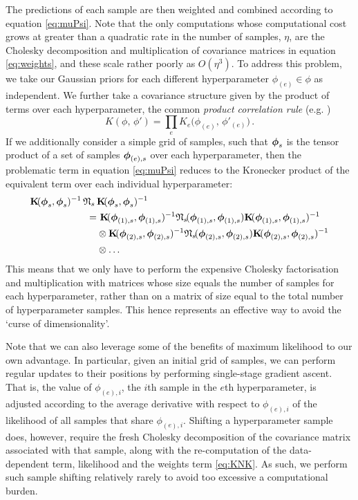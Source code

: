 \documentclass{acmtrans2m}
\begin{document}
The predictions of each sample are then weighted and combined according to equation \eqref{eq:muPsi}. Note that the only computations whose computational cost grows at greater than a quadratic rate in the number of samples, $\eta$, are the Cholesky decomposition and multiplication of covariance matrices in equation \eqref{eq:weights}, and these scale rather poorly as $O(\eta^3)$. To address this problem, we take our Gaussian priors for each different hyperparameter $\phi_{(e)} \in \phi$ as independent. We further take a covariance structure given by the product of terms over each hyperparameter, the common \emph{product correlation rule} (e.g. )
\begin{equation}
 K(\phi,\,\phi')=\prod_e K_e\Big(\phi_{(e)},\,\phi'_{(e)}\Big)\,.
\end{equation}
If we additionally consider a simple grid of samples, such that $\boldsymbol{\phi}_s$ is the tensor product of a set of samples $\boldsymbol{\phi}_{(e),s}$ over each hyperparameter, then the problematic term in equation \eqref{eq:muPsi} reduces to the Kronecker product of the equivalent term over each individual hyperparameter:
\begin{align}\label{eq:KNK}
\mat{K} \!(\vph_s,\vph_s)^{-1}\,\Nt\,&\mat{K}\!(\vph_s,\vph_s)^{-1}\nonumber\\
 = & ~\mat{K}\!(\vph_{(1),s},\vph_{(1),s})^{-1}\Nt\!(\vph_{(1),s},\vph_{(1),s})\mat{K}\!(\vph_{(1),s},\vph_{(1),s})^{-1}\nonumber\\ & \otimes \mat{K}\!(\vph_{(2),s},\vph_{(2),s})^{-1}\Nt\!(\vph_{(2),s},\vph_{(2),s})\mat{K}\!(\vph_{(2),s},\vph_{(2),s})^{-1}\nonumber\\ & \otimes \ldots
\end{align}
This means that we only have to perform the expensive Cholesky factorisation and multiplication with matrices whose size equals the number of samples for each hyperparameter, rather than on a matrix of size equal to the total number of hyperparameter samples. This hence represents an effective way to avoid the `curse of dimensionality'. 

Note that we can also leverage some of the benefits of maximum likelihood to our own advantage. In particular, given an initial grid of samples, we can perform regular updates to their positions by performing single-stage gradient ascent. That is, the value of $\phi_{(e),i}$, the $i$th sample in the $e$th hyperparameter, is adjusted according to the average derivative with respect to $\phi_{(e),i}$ of the likelihood of all samples that share $\phi_{(e),i}$. Shifting a hyperparameter sample does, however, require the fresh Cholesky decomposition of the covariance matrix associated with that sample, along with the re-computation of the data-dependent term, likelihood and the weights term \eqref{eq:KNK}. As such, we perform such sample shifting relatively rarely to avoid too excessive a computational burden.
\end{document}
